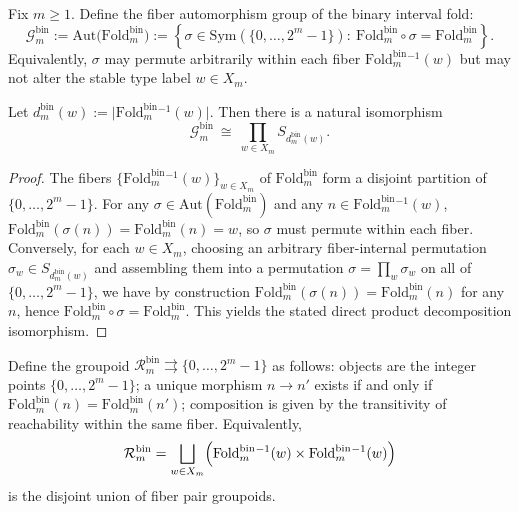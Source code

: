 \begin{definition}\label{def:fold-bin-gauge-group}
Fix \(m\ge 1\). Define the fiber automorphism group of the binary interval fold:
\[
\mathcal{G}^{\mathrm{bin}}_m
:=
\mathrm{Aut}\!\bigl(\mathrm{Fold}^{\mathrm{bin}}_m\bigr)
:=
\left\{\sigma\in \mathrm{Sym}(\{0,\dots,2^m-1\}):\ \mathrm{Fold}^{\mathrm{bin}}_m\circ\sigma=\mathrm{Fold}^{\mathrm{bin}}_m\right\}.
\]
Equivalently, \(\sigma\) may permute arbitrarily within each fiber \(\mathrm{Fold}^{\mathrm{bin}}_m{}^{-1}(w)\) but may not alter the stable type label \(w\in X_m\).
\end{definition}

\begin{proposition}\label{prop:fold-bin-gauge-decomposition}
Let \(d^{\mathrm{bin}}_m(w):=\bigl|\mathrm{Fold}^{\mathrm{bin}}_m{}^{-1}(w)\bigr|\).
Then there is a natural isomorphism
\[
\mathcal{G}^{\mathrm{bin}}_m\ \cong\ \prod_{w\in X_m} S_{d^{\mathrm{bin}}_m(w)}.
\]
\end{proposition}
\begin{proof}
The fibers \(\{\mathrm{Fold}^{\mathrm{bin}}_m{}^{-1}(w)\}_{w\in X_m}\) of \(\mathrm{Fold}^{\mathrm{bin}}_m\) form a disjoint partition of \(\{0,\dots,2^m-1\}\).
For any \(\sigma\in\mathrm{Aut}(\mathrm{Fold}^{\mathrm{bin}}_m)\) and any \(n\in \mathrm{Fold}^{\mathrm{bin}}_m{}^{-1}(w)\),
\(\mathrm{Fold}^{\mathrm{bin}}_m(\sigma(n))=\mathrm{Fold}^{\mathrm{bin}}_m(n)=w\), so \(\sigma\) must permute within each fiber.
Conversely, for each \(w\in X_m\), choosing an arbitrary fiber-internal permutation \(\sigma_w\in S_{d^{\mathrm{bin}}_m(w)}\) and assembling them into a permutation \(\sigma=\prod_w\sigma_w\) on all of \(\{0,\dots,2^m-1\}\), we have by construction \(\mathrm{Fold}^{\mathrm{bin}}_m(\sigma(n))=\mathrm{Fold}^{\mathrm{bin}}_m(n)\) for any \(n\), hence \(\mathrm{Fold}^{\mathrm{bin}}_m\circ\sigma=\mathrm{Fold}^{\mathrm{bin}}_m\).
This yields the stated direct product decomposition isomorphism.
\end{proof}

\begin{definition}\label{def:fold-bin-fiber-groupoid}
Define the groupoid \(\mathcal{R}^{\mathrm{bin}}_m\rightrightarrows \{0,\dots,2^m-1\}\) as follows: objects are the integer points \(\{0,\dots,2^m-1\}\);
a unique morphism \(n\to n'\) exists if and only if \(\mathrm{Fold}^{\mathrm{bin}}_m(n)=\mathrm{Fold}^{\mathrm{bin}}_m(n')\);
composition is given by the transitivity of reachability within the same fiber.
Equivalently,
\[
\mathcal{R}^{\mathrm{bin}}_m
=\bigsqcup_{w\in X_m}\Bigl(\mathrm{Fold}^{\mathrm{bin}}_m{}^{-1}(w)\times \mathrm{Fold}^{\mathrm{bin}}_m{}^{-1}(w)\Bigr)
\]
is the disjoint union of fiber pair groupoids.
\end{definition}

